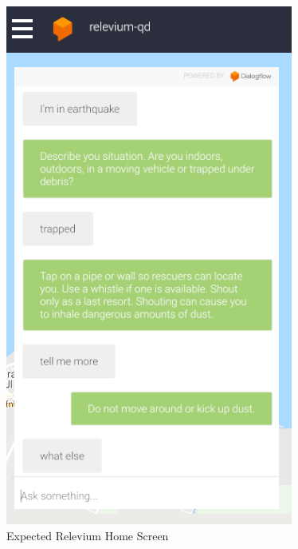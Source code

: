 \documentclass{scrreprt}
\begin{document}
\begin{figure}[ht!]
    \includegraphics[height=0.3\textheight]{AppDesign/expectedDesign/2.png}
    \caption{Expected Relevium Home Screen}%
    \label{fig:Expected_Draft}%
  \end{figure}
  
\end{document}
